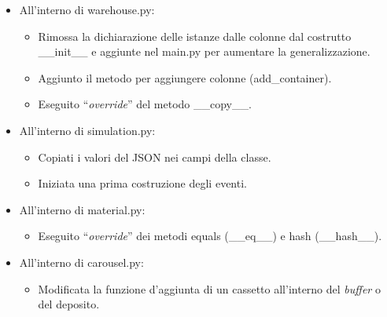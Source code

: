 \documentclass[a4paper]{article}
\newcommand{\dquotes}[1]{``#1''}
\begin{document}
\begin{itemize}[label=]
		\item All'interno di \textsf{warehouse.py}:
			\begin{itemize}
				\item Rimossa la dichiarazione delle istanze dalle colonne dal costrutto \textsf{\_\_init\_\_} e aggiunte nel \textsf{main.py} per aumentare la generalizzazione.
				
				\item Aggiunto il metodo per aggiungere colonne (\textsf{add\_container}).
				
				\item Eseguito \dquotes{\emph{override}} del metodo \textsf{\_\_copy\_\_}.
			\end{itemize}
		
		\item All'interno di \textsf{simulation.py}:
			\begin{itemize}
				\item Copiati i valori del \textsf{JSON} nei campi della classe.
				
				\item Iniziata una prima costruzione degli eventi.
			\end{itemize}
		
		\item All'interno di \textsf{material.py}:
			\begin{itemize}
				\item Eseguito \dquotes{\emph{override}} dei metodi \textsf{equals (\_\_eq\_\_)} e \textsf{hash (\_\_hash\_\_)}.
			\end{itemize}
		
		\item All'interno di \textsf{carousel.py}:
			\begin{itemize}
				\item Modificata la funzione d'aggiunta di un cassetto all'interno del \emph{buffer} o del deposito.
			\end{itemize}
	\end{itemize}
\end{document}
